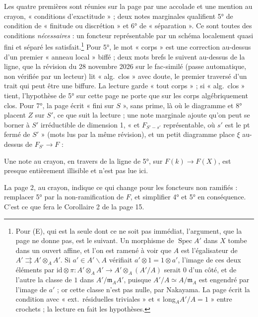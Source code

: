 \documentclass[11pt,a4paper]{article}
\begin{document}
Les quatre premières sont réunies sur la page par une accolade et une mention
au crayon, « conditions d'exactitude » ; deux notes marginales qualifient 5°
de condition de « finitude ou discrétion » et 6° de « séparation ». Ce sont
toutes des conditions \emph{nécessaires} : un foncteur représentable par un
schéma localement quasi fini et séparé les satisfait.\footnote{Pour (E), qui
est la seule dont ce ne soit pas immédiat, l'argument, que la page ne donne
pas, est le suivant. Un morphisme de $\operatorname{Spec} A'$ dans $X$ tombe
dans un ouvert affine, et l'on est ramené à voir que $A$ est l'égalisateur de
$A' \rightrightarrows A' \otimes_A A'$. Si $a' \in A' \smallsetminus A$
vérifiait $a' \otimes 1 = 1 \otimes a'$, l'image de ces deux éléments par
$\mathrm{id} \otimes \pi : A' \otimes_A A' \to A' \otimes_A (A'/A)$ serait
$0$ d'un côté, et de l'autre la classe de $1$ dans $A'/\mathfrak{m}_A A'$,
puisque $A'/A \simeq A/\mathfrak{m}_A$ est engendré par l'image de $a'$ ; or
cette classe n'est pas nulle, par Nakayama. La page écrit la condition avec
« ext.\ résiduelles triviales » et « long$_A A'/A = 1$ » entre crochets ; la
lecture en fait les hypothèses.} Pour 5°, le mot « corps » est une correction
au-dessus d'un premier « anneau local » biffé ; deux mots brefs le suivent
au-dessus de la ligne, que la révision du 28 novembre 2026 sur le fac-similé
(passe automatique, non vérifiée par un lecteur) lit « alg.\ clos » avec
doute, le premier traversé d'un trait qui peut être une biffure. La lecture
garde « tout corps » ; si « alg.\ clos » tient, l'hypothèse de 5° sur cette
page ne porte que sur les corps algébriquement clos. Pour 7°, la page écrit
« fini sur $S$ », sans prime, là où le diagramme et 8° placent $Z$ sur $S'$,
ce que suit la lecture ; une note marginale ajoute qu'on peut se borner à
$S'$ irréductible de dimension 1, « et $F_{S' - s'}$ représentable, où $s'$
est le pt fermé de $S'$ » (mots lus par la même révision), et un petit
diagramme place $\xi$ au-dessus de $F_{S'} \to F$ :


Une note au crayon, en travers de la ligne de 5°, sur $F(k) \to F(X)$, est
presque entièrement illisible et n'est pas lue ici.

La page 2, au crayon, indique ce qui change pour les foncteurs non ramifiés :
remplacer 5° par la non-ramification de $F$, et simplifier 4° et 5° en
conséquence. C'est ce que fera le Corollaire 2 de la page 15.
\end{document}
